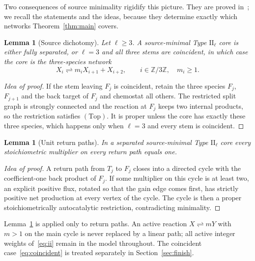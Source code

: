 \documentclass[11pt,a4paper]{article}
\theoremstyle{plain}
\newtheorem{lemma}[theorem]{Lemma}
\theoremstyle{definition}
\theoremstyle{remark}
\numberwithin{equation}{section}
\newcommand{\Z}{\mathbb{Z}}
\newcommand{\II}{\mathrm{II}}
\newcommand{\Top}{\mathrm{(Top)}}
\begin{document}
Two consequences of source minimality rigidify this picture. They are proved in~\cite[Lemmas~3.1 and~3.2]{TypeIIpos}; we recall the statements and the ideas, because they determine exactly which networks Theorem~\ref{thm:main} covers.

\begin{lemma}[Source dichotomy]\label{lem:exhaustion}
Let $\ell\ge3$. A source-minimal Type $\II_\ell$ core is either fully separated, or $\ell=3$ and all three stems are coincident, in which case the core is the three-species network
\begin{equation}\label{eq:coincident}
X_i\rightleftharpoons m_iX_{i+1}+X_{i+2},\qquad i\in\Z/3\Z,\quad m_i\ge1 .
\end{equation}
\end{lemma}

\begin{proof}[Idea of proof]
If the stem leaving $F_j$ is coincident, retain the three species $F_j$, $F_{j+1}$ and the back target of $F_j$ and chemostat all others. The restricted split graph is strongly connected and the reaction at $F_j$ keeps two internal products, so the restriction satisfies $\Top$. It is proper unless the core has exactly these three species, which happens only when $\ell=3$ and every stem is coincident.
\end{proof}

\begin{lemma}[Unit return paths]\label{lem:unit}
In a separated source-minimal Type $\II_\ell$ core every stoichiometric multiplier on every return path equals one.
\end{lemma}

\begin{proof}[Idea of proof]
A return path from $T_j$ to $F_j$ closes into a directed cycle with the coefficient-one back product of $F_j$. If some multiplier on this cycle is at least two, an explicit positive flux, rotated so that the gain edge comes first, has strictly positive net production at every vertex of the cycle. The cycle is then a proper stoichiometrically autocatalytic restriction, contradicting minimality.
\end{proof}

Lemma~\ref{lem:unit} is applied only to return paths. An active reaction $X\rightleftharpoons mY$ with $m>1$ on the main cycle is never replaced by a linear path; all active integer weights of~\eqref{eq:ii} remain in the model throughout. The coincident case~\eqref{eq:coincident} is treated separately in Section~\ref{sec:finish}.
\end{document}
